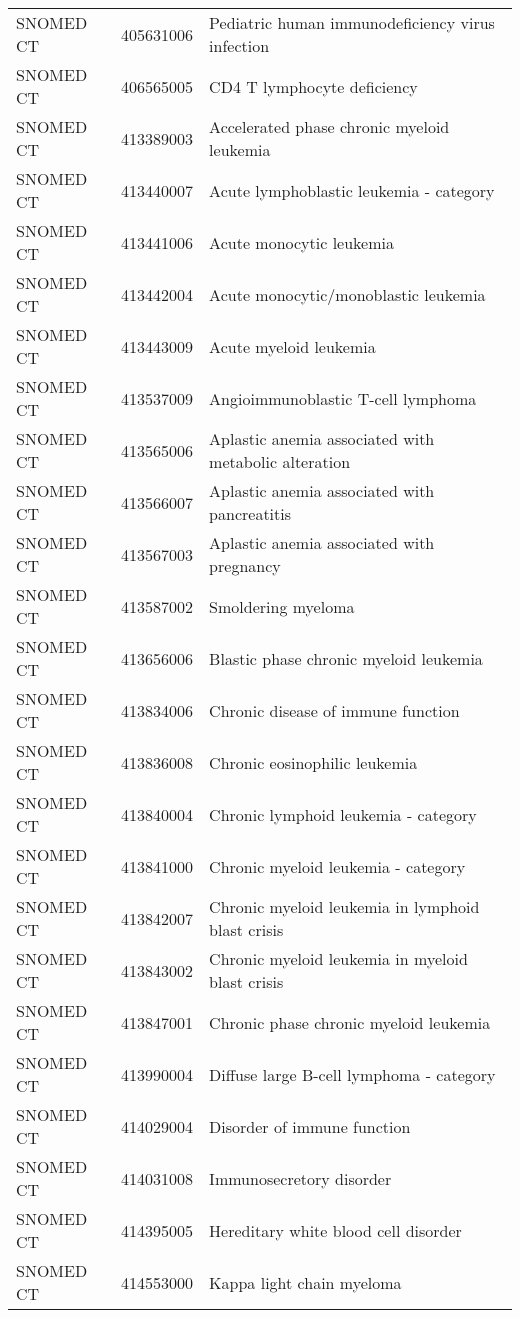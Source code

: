 \begin{table}[ht]
\begin{tabular}{lll}
  SNOMED CT & 405631006 & Pediatric human immunodeficiency virus infection \\ 
  SNOMED CT & 406565005 & CD4 T lymphocyte deficiency \\ 
  SNOMED CT & 413389003 & Accelerated phase chronic myeloid leukemia \\ 
  SNOMED CT & 413440007 & Acute lymphoblastic leukemia - category \\ 
  SNOMED CT & 413441006 & Acute monocytic leukemia \\ 
  SNOMED CT & 413442004 & Acute monocytic/monoblastic leukemia \\ 
  SNOMED CT & 413443009 & Acute myeloid leukemia \\ 
  SNOMED CT & 413537009 & Angioimmunoblastic T-cell lymphoma \\ 
  SNOMED CT & 413565006 & Aplastic anemia associated with metabolic alteration \\ 
  SNOMED CT & 413566007 & Aplastic anemia associated with pancreatitis \\ 
  SNOMED CT & 413567003 & Aplastic anemia associated with pregnancy \\ 
  SNOMED CT & 413587002 & Smoldering myeloma \\ 
  SNOMED CT & 413656006 & Blastic phase chronic myeloid leukemia \\ 
  SNOMED CT & 413834006 & Chronic disease of immune function \\ 
  SNOMED CT & 413836008 & Chronic eosinophilic leukemia \\ 
  SNOMED CT & 413840004 & Chronic lymphoid leukemia - category \\ 
  SNOMED CT & 413841000 & Chronic myeloid leukemia - category \\ 
  SNOMED CT & 413842007 & Chronic myeloid leukemia in lymphoid blast crisis \\ 
  SNOMED CT & 413843002 & Chronic myeloid leukemia in myeloid blast crisis \\ 
  SNOMED CT & 413847001 & Chronic phase chronic myeloid leukemia \\ 
  SNOMED CT & 413990004 & Diffuse large B-cell lymphoma - category \\ 
  SNOMED CT & 414029004 & Disorder of immune function \\ 
  SNOMED CT & 414031008 & Immunosecretory disorder \\ 
  SNOMED CT & 414395005 & Hereditary white blood cell disorder \\ 
  SNOMED CT & 414553000 & Kappa light chain myeloma \\ 

\end{tabular}
\end{table}
